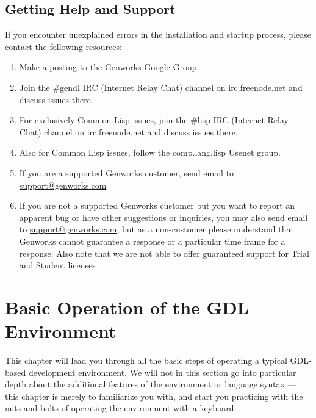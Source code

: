 \documentclass [11pt]{book}
\begin{document}
\section{Getting Help and Support}

\label{sec:gettinghelpandsupport}

If you encounter unexplained errors in the installation and
startup process, please contact the following resources:

\begin{enumerate}

\item Make a posting to the \href{http://groups.google.com/group/genworks}{Genworks Google Group}

\item Join the \#gendl IRC (Internet Relay Chat) channel on
	irc.freenode.net and discuss issues there.

\item For exclusively Common Lisp issues, join the \#lisp
	IRC (Internet Relay Chat) channel on irc.freenode.net and
	discuss issues there.

\item Also for Common Lisp issues, follow the comp.lang.lisp
	Usenet group.

\item If you are a supported Genworks customer, send email to \href{mailto:support@genworks.com}{support@genworks.com}

\item If you are not a supported Genworks customer but you want to report an apparent bug or have other suggestions or inquiries, you may also send email to \href{mailto:support@genworks.com}{support@genworks.com}, but as a non-customer please understand that Genworks
	  cannot guarantee a response or a particular time frame for a
	  response. Also note that we are not able to offer guaranteed
	  support for Trial and Student licenses 

\end{enumerate}



\chapter{Basic Operation of the GDL Environment}

\label{chap:basicoperationofthegdlenvironment}

This chapter will lead you through all the basic steps of
operating a typical GDL-based development environment. We will not in
this section go into particular depth about the additional features of
the environment or language syntax --- this chapter is merely to
familiarize you with, and start you practicing with the nuts and bolts
of operating the environment with a keyboard.
\end{document}
